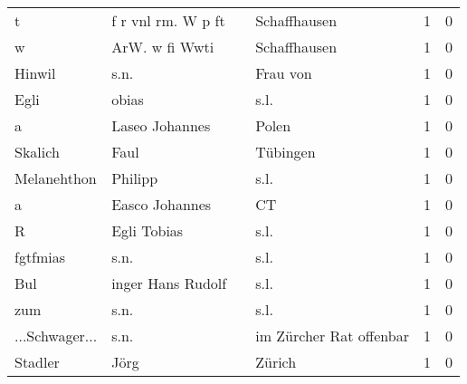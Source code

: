 \begin{center}
\begin{tiny}
\begin{longtabu}{llllrr}
                        t &                 f r vnl rm. W p ft &             &                                Schaffhausen &          1 &         0 \\
                        w &                     ArW. w fi Wwti &             &                                Schaffhausen &          1 &         0 \\
                   Hinwil &                               s.n. &             &                                    Frau von &          1 &         0 \\
                     Egli &                              obias &             &                                        s.l. &          1 &         0 \\
                        a &                     Laseo Johannes &             &                                       Polen &          1 &         0 \\
                  Skalich &                               Faul &             &                                    Tübingen &          1 &         0 \\
              Melanehthon &                            Philipp &             &                                        s.l. &          1 &         0 \\
                        a &                     Easco Johannes &             &                                          CT &          1 &         0 \\
                        R &                        Egli Tobias &             &                                        s.l. &          1 &         0 \\
                 fgtfmias &                               s.n. &             &                                        s.l. &          1 &         0 \\
                      Bul &                  inger Hans Rudolf &             &                                        s.l. &          1 &         0 \\
                      zum &                               s.n. &             &                                        s.l. &          1 &         0 \\
           ...Schwager... &                               s.n. &             &                     im Zürcher Rat offenbar &          1 &         0 \\
                  Stadler &                               Jörg &             &                                      Zürich &          1 &         0 \\

\end{longtabu}
\end{tiny}
\end{center}
